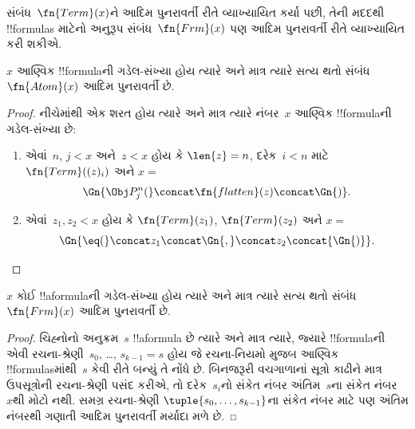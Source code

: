 \documentclass[../../../include/open-logic-section]{subfiles}
\begin{document}

સંબંધ~$\fn{Term}(x)$ને આદિમ
પુનરાવર્તી રીતે વ્યાખ્યાયિત કર્યા પછી,
તેની મદદથી !!{formula}s માટેનો અનુરૂપ
સંબંધ~$\fn{Frm}(x)$ પણ આદિમ
પુનરાવર્તી રીતે વ્યાખ્યાયિત કરી શકીએ.

\begin{prop}
$x$ આણ્વિક !!{formula}ની ગડેલ-સંખ્યા
હોય ત્યારે અને માત્ર ત્યારે સત્ય થતો
સંબંધ~$\fn{Atom}(x)$ આદિમ પુનરાવર્તી છે.
\end{prop}

\begin{proof}
નીચેમાંથી એક શરત હોય ત્યારે અને માત્ર
ત્યારે નંબર~$x$ આણ્વિક !!{formula}ની
ગડેલ-સંખ્યા છે:
\begin{enumerate}
\item એવાં~$n$, $j < x$ અને~$z < x$
  હોય કે $\len{z}=n$, દરેક~$i < n$ માટે
  $\fn{Term}((z)_i)$ અને $x = $
\[
\Gn{\Obj P^n_j(} \concat \fn{flatten}(z) \concat \Gn{)}.
\]
\item એવાં~$z_1, z_2 < x$ હોય કે
  $\fn{Term}(z_1)$, $\fn{Term}(z_2)$
  અને $x = $
\[
\Gn{{\eq}(} \concat z_1 \concat \Gn{,} \concat z_2 \concat{\Gn{)}}.
\]
\end{enumerate}
\end{proof}

\begin{prop}
$x$ કોઈ !!a{formula}ની ગડેલ-સંખ્યા
હોય ત્યારે અને માત્ર ત્યારે સત્ય થતો
સંબંધ~$\fn{Frm}(x)$ આદિમ પુનરાવર્તી છે.
\end{prop}

\begin{proof}
ચિહ્નોનો અનુક્રમ~$s$ !!a{formula} છે
ત્યારે અને માત્ર ત્યારે, જ્યારે
!!{formula}ની એવી રચના-શ્રેણી~$s_0$,
\dots, $s_{k-1} = s$ હોય જે રચના-નિયમો
મુજબ આણ્વિક !!{formula}sમાંથી~$s$
કેવી રીતે બન્યું તે નોંધે છે. બિનજરૂરી
વચગાળાનાં સૂત્રો કાઢીને માત્ર ઉપસૂત્રોની
રચના-શ્રેણી પસંદ કરીએ, તો દરેક~$s_i$નો
સંકેત નંબર અંતિમ~$s$ના સંકેત નંબર~$x$થી
મોટો નથી. સમગ્ર રચના-શ્રેણી
$\tuple{s_0, \dots, s_{k-1}}$ના સંકેત
નંબર માટે પણ અંતિમ નંબરથી ગણાતી
આદિમ પુનરાવર્તી મર્યાદા મળે છે.
\end{proof}
\end{document}

